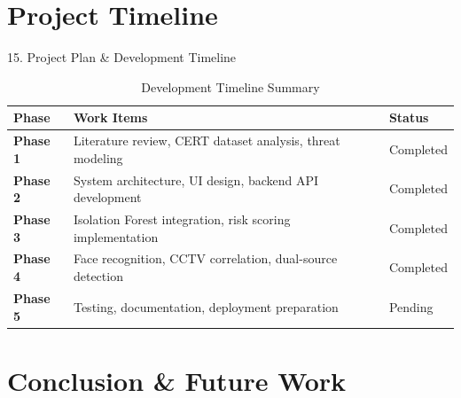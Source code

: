 \documentclass[aspectratio=169]{beamer}
\begin{document}

\section{Project Timeline}

\begin{frame}{15. Project Plan \& Development Timeline}

\small
\begin{table}
\centering
\renewcommand{\arraystretch}{1.4}
\begin{tabular}{|p{2cm}|p{5.5cm}|p{2cm}|}
\hline
\textbf{Phase} & \textbf{Work Items} & \textbf{Status} \\
\hline
\textbf{Phase 1} & Literature review, CERT dataset analysis, threat modeling & Completed \\
\hline
\textbf{Phase 2} & System architecture, UI design, backend API development & Completed \\
\hline
\textbf{Phase 3} & Isolation Forest integration, risk scoring implementation & Completed \\
\hline
\textbf{Phase 4} & Face recognition, CCTV correlation, dual-source detection & Completed \\
\hline
\textbf{Phase 5} & Testing, documentation, deployment preparation & Pending \\
\hline
\end{tabular}
\caption{Development Timeline Summary}
\end{table}

\end{frame}


\section{Conclusion \& Future Work}
\end{document}
